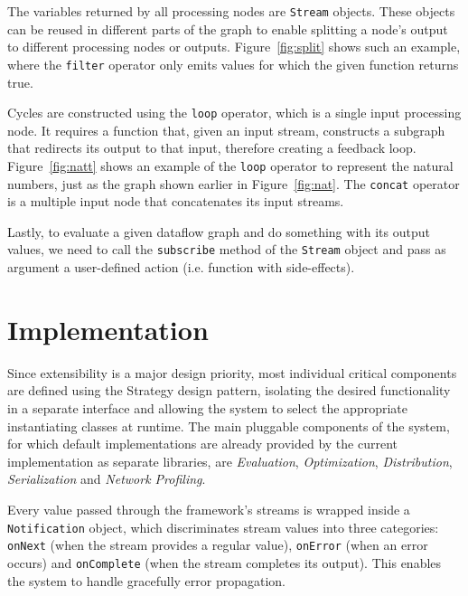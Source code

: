 \documentclass[sigplan,screen]{acmart}
\begin{document}
The variables returned by all processing nodes are \texttt{Stream} objects. These
objects can be reused in different parts of the graph to enable splitting a
node's output to different processing nodes or outputs. Figure~\ref{fig:split}
shows such an example, where the \texttt{filter} operator only emits values for
which the given function returns true.

Cycles are constructed using the \texttt{loop} operator, which is a single
input processing node. It requires a function that, given an input stream,
constructs a subgraph that redirects its output to that input, therefore
creating a feedback loop. Figure~\ref{fig:natt} shows an example of the
\texttt{loop} operator to represent the natural numbers, just as the graph
shown earlier in Figure~\ref{fig:nat}. The \texttt{concat} operator is a
multiple input node that concatenates its input streams.


Lastly, to evaluate a given dataflow graph and do something with its output values, we
need to call the \texttt{subscribe} method of the \texttt{Stream} object and pass as argument
a user-defined action (i.e. function with side-effects).
%

\section{Implementation} \label{sec:implementation}

Since extensibility is a major design priority, most individual critical
components are defined using the Strategy design pattern, isolating the desired
functionality in a separate interface and allowing the system to select the
appropriate instantiating classes at runtime. The main pluggable components of
the system, for which default implementations are already provided by the
current implementation as separate libraries, are \textit{Evaluation},
\textit{Optimization}, \textit{Distribution}, \textit{Serialization} and
\textit{Network Profiling}.

Every value passed through the framework's streams is wrapped inside a
\texttt{Notification} object, which discriminates stream values into three
categories: \texttt{onNext} (when the stream provides a regular value),
\texttt{onError} (when an error occurs) and \texttt{onComplete} (when the
stream completes its output). This enables the system to handle gracefully
error propagation.
\end{document}
